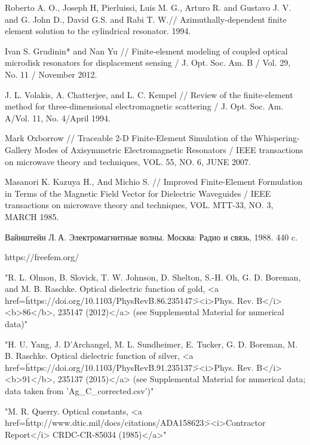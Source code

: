 \documentclass[%
specialist,  %
subf,        %
href,        %
colorlinks,  %
]{disser}
\begin{document}

\clearpage


%



\printbibliography[heading=bibintoc]
\begin{thebibliography}{99}	
	 Roberto A. O., Joseph H, Pierluissi, Luis M. G., Arturo R. and Gustavo J. V. and G. John D., David G.S. and Rabi T. W.// Azimuthally-dependent finite element solution to the cylindrical resonator. 1994.
	
	  Ivan S. Grudinin* and Nan Yu // Finite-element modeling of coupled optical microdisk resonators for displacement sensing / J. Opt. Soc. Am. B / Vol. 29, No. 11 / November 2012.
	
	
	 J. L. Volakis, A. Chatterjee, and L. C. Kempel // Review of the finite-element method for three-dimensional electromagnetic scattering / J. Opt. Soc. Am. A/Vol. 11, No. 4/April 1994.
	
	
	 Mark Oxborrow // Traceable 2-D Finite-Element Simulation of the Whispering-Gallery Modes of Axisymmetric Electromagnetic Resonators / IEEE transactions on microwave theory and techniques, VOL. 55, NO. 6, JUNE 2007.
	
	
	 Masanori K. Kazuya H., And Michio S. // Improved Finite-Element Formulation in Terms of the Magnetic Field Vector for Dielectric Waveguides / IEEE transactions on microwave theory and techniques, VOL. MTT-33, NO. 3, MARCH 1985.

	Вайнштейн Л.\,А. {Электромагнитные волны}. Москва: Радио и связь, 1988. 440 c.
	
	 https://freefem.org/
	
	 "R. L. Olmon, B. Slovick, T. W. Johnson, D. Shelton, S.-H. Oh, G. D. Boreman, and M. B. Raschke. Optical dielectric function of gold, <a href=\"https://doi.org/10.1103/PhysRevB.86.235147\"><i>Phys. Rev. B</i> <b>86</b>, 235147 (2012)</a> (see Supplemental Material for numerical data)"
	
	"H. U. Yang, J. D'Archangel, M. L. Sundheimer, E. Tucker, G. D. Boreman, M. B. Raschke. Optical dielectric function of silver, <a href=\"https://doi.org/10.1103/PhysRevB.91.235137\"><i>Phys. Rev. B</i> <b>91</b>, 235137 (2015)</a> (see Supplemental Material for numerical data; data taken from 'Ag_C_corrected.csv')"
	
	"M. R. Querry. Optical constants, <a href=\"http://www.dtic.mil/docs/citations/ADA158623\"><i>Contractor Report</i> CRDC-CR-85034 (1985)</a>"
	
	
\end{thebibliography}

%
\end{document}
